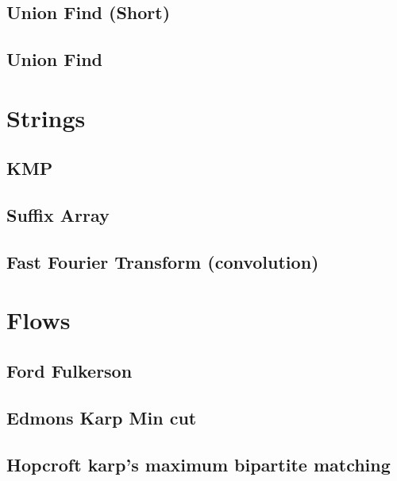 \subsection{Union Find (Short)}
\raggedbottom
\hrulefill
\subsection{Union Find}
\raggedbottom
\hrulefill

\section{Strings}
\subsection{KMP}
\raggedbottom
\hrulefill
\subsection{Suffix Array}
\raggedbottom
\hrulefill
\subsection{Fast Fourier Transform (convolution)}
\raggedbottom
\hrulefill

\section{Flows}
\subsection{Ford Fulkerson}
\raggedbottom
\hrulefill
\subsection{Edmons Karp Min cut}
\raggedbottom
\hrulefill
\subsection{Hopcroft karp's maximum bipartite matching}
\raggedbottom
\hrulefill
